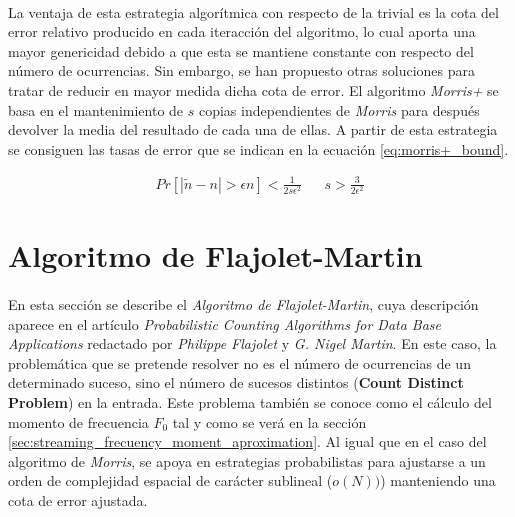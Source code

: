 \documentclass{subfiles}
\begin{document}
      \paragraph{}
      La ventaja de esta estrategia algorítmica con respecto de la trivial es la cota del error relativo producido en cada iteracción del algoritmo, lo cual aporta una mayor genericidad debido a que esta se mantiene constante con respecto del número de ocurrencias. Sin embargo, se han propuesto otras soluciones para tratar de reducir en mayor medida dicha cota de error. El algoritmo \emph{Morris+} se basa en el mantenimiento de $s$ copias independientes de \emph{Morris} para después devolver la media del resultado de cada una de ellas. A partir de esta estrategia se consiguen las tasas de error que se indican en la ecuación \eqref{eq:morris+_bound}.

      \begin{align}
      \label{eq:morris+_bound}
        Pr[|\widetilde{n} - n| > \epsilon n ] < \frac{1}{2s\epsilon^2} && s > \frac{3}{2\epsilon^2}
      \end{align}


    \section{Algoritmo de Flajolet-Martin}
    \label{sec:streaming_morris_algorithm}

      \paragraph{}
      En esta sección se describe el \emph{Algoritmo de Flajolet-Martin}, cuya descripción aparece en el artículo \emph{Probabilistic Counting Algorithms for Data Base Applications} \cite{flajolet1985probabilistic} redactado por \emph{Philippe Flajolet} y \emph{G. Nigel Martin}. En este caso, la problemática que se pretende resolver no es el número de ocurrencias de un determinado suceso, sino el número de sucesos distintos (\textbf{Count Distinct Problem}) en la entrada. Este problema también se conoce como el cálculo del momento de frecuencia $F_0$ tal y como se verá en la sección \ref{sec:streaming_frecuency_moment_aproximation}. Al igual que en el caso del algoritmo de \emph{Morris}, se apoya en estrategias probabilistas para ajustarse a un orden de complejidad espacial de carácter sublineal ($o(N))$) manteniendo una cota de error ajustada.
\end{document}
